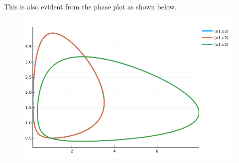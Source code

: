 This is also evident from the phase plot as shown below.

\begin{figure}[H]
	\includegraphics[scale=0.65]{images/ode_04_06.png}
\end{figure}
